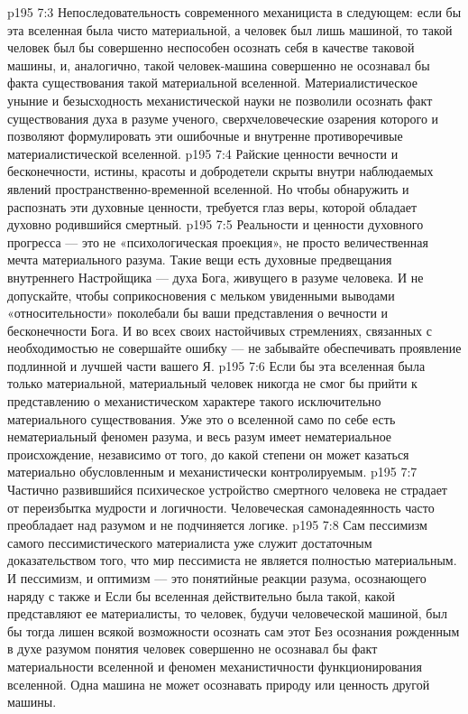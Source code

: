 \vs p195 7:3 Непоследовательность современного механициста в следующем: если бы эта вселенная была чисто материальной, а человек был лишь машиной, то такой человек был бы совершенно неспособен осознать себя в качестве таковой машины, и, аналогично, такой человек\hyp{}машина совершенно не осознавал бы факта существования такой материальной вселенной. Материалистическое уныние и безысходность механистической науки не позволили осознать факт существования духа в разуме ученого, сверхчеловеческие озарения которого и позволяют формулировать эти ошибочные и внутренне противоречивые  материалистической вселенной.
\vs p195 7:4 Райские ценности вечности и бесконечности, истины, красоты и добродетели скрыты внутри наблюдаемых явлений пространственно\hyp{}временной вселенной. Но чтобы обнаружить и распознать эти духовные ценности, требуется глаз веры, которой обладает духовно родившийся смертный.
\vs p195 7:5 Реальности и ценности духовного прогресса --- это не «психологическая проекция», не просто величественная мечта материального разума. Такие вещи есть духовные предвещания внутреннего Настройщика --- духа Бога, живущего в разуме человека. И не допускайте, чтобы соприкосновения с мельком увиденными выводами «относительности» поколебали бы ваши представления о вечности и бесконечности Бога. И во всех своих настойчивых стремлениях, связанных с необходимостью  не совершайте ошибку --- не забывайте обеспечивать  проявление подлинной и лучшей части вашего Я.
\vs p195 7:6 Если бы эта вселенная была только материальной, материальный человек никогда не смог бы прийти к представлению о механистическом характере такого исключительно материального существования. Уже это  о вселенной само по себе есть нематериальный феномен разума, и весь разум имеет нематериальное происхождение, независимо от того, до какой степени он может казаться материально обусловленным и механистически контролируемым.
\vs p195 7:7 Частично развившийся психическое устройство смертного человека не страдает от переизбытка мудрости и логичности. Человеческая самонадеянность часто преобладает над разумом и не подчиняется логике.
\vs p195 7:8 Сам пессимизм самого пессимистического материалиста уже служит достаточным доказательством того, что мир пессимиста не является полностью материальным. И пессимизм, и оптимизм --- это понятийные реакции разума, осознающего наряду с  также и  Если бы вселенная действительно была такой, какой представляют ее материалисты, то человек, будучи человеческой машиной, был бы тогда лишен всякой возможности осознать сам этот  Без осознания рожденным в духе разумом понятия  человек совершенно не осознавал бы факт материальности вселенной и феномен механистичности функционирования вселенной. Одна машина не может осознавать природу или ценность другой машины.
